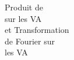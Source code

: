 \begin{flushright}
Produit de \\
sur les VA\\
et Transformation\\
de Fourier sur\\
les VA
\end{flushright}
